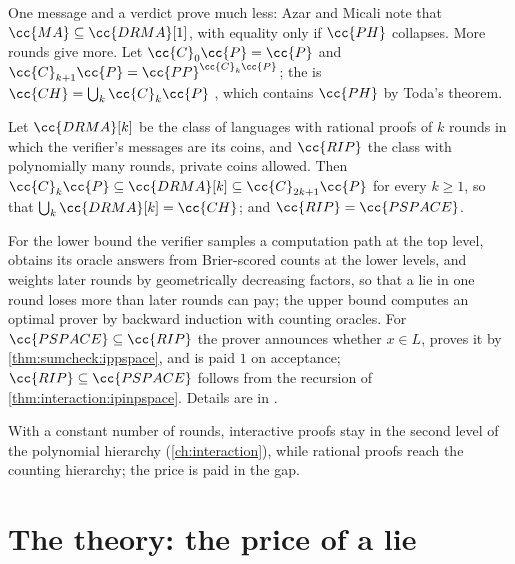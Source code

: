 \begin{refsection}
One message and a verdict prove much less: Azar and Micali note that $\cc{MA}\subseteq\cc{DRMA}[1]$, with equality only if $\cc{PH}$ collapses. More rounds give more. Let $\cc{C}_0\cc{P}=\cc{P}$ and $\cc{C}_{k+1}\cc{P}=\cc{PP}^{\cc{C}_k\cc{P}}$; the  is $\cc{CH}=\bigcup_k\cc{C}_k\cc{P}$ \parencite{Wagner1986}, which contains $\cc{PH}$ by Toda's theorem.

\begin{theorem}\label{thm:rational:classes}
Let $\cc{DRMA}[k]$ be the class of languages with rational proofs of $k$ rounds in which the verifier's messages are its coins, and $\cc{RIP}$ the class with polynomially many rounds, private coins allowed. Then $\cc{C}_k\cc{P}\subseteq\cc{DRMA}[k]\subseteq\cc{C}_{2k+1}\cc{P}$ for every $k\ge1$, so that $\bigcup_k\cc{DRMA}[k]=\cc{CH}$; and $\cc{RIP}=\cc{PSPACE}$.
\end{theorem}

\begin{proofsketch}
For the lower bound the verifier samples a computation path at the top level, obtains its oracle answers from Brier-scored counts at the lower levels, and weights later rounds by geometrically decreasing factors, so that a lie in one round loses more than later rounds can pay; the upper bound computes an optimal prover by backward induction with counting oracles. For $\cc{PSPACE}\subseteq\cc{RIP}$ the prover announces whether $x\in L$, proves it by \cref{thm:sumcheck:ippspace}, and is paid $1$ on acceptance; $\cc{RIP}\subseteq\cc{PSPACE}$ follows from the recursion of \cref{thm:interaction:ipinpspace}. Details are in \textcite[Sections~5--6]{AzarMicali2012}.
\end{proofsketch}

With a constant number of rounds, interactive proofs stay in the second level of the polynomial hierarchy (\cref{ch:interaction}), while rational proofs reach the counting hierarchy; the price is paid in the gap.

\section{The theory: the price of a lie}\label{sec:rational:gap}


\end{refsection}

